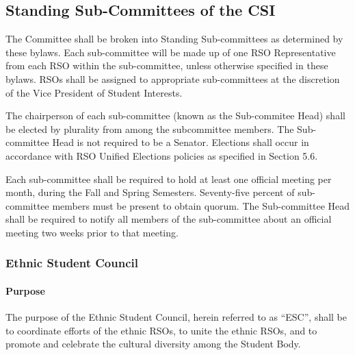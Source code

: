 \documentclass[12pt]{scrreprt}
\begin{document}
\subsection{Standing Sub-Committees of the CSI} \label{sec:csi_subcommittees}
The Committee shall be broken into Standing Sub-committees as determined by 
these bylaws. Each sub-committee will be made up of one RSO Representative from each RSO within the sub-committee, unless otherwise 
specified in these bylaws. RSOs shall be assigned to appropriate sub-committees at the discretion of the Vice President of Student Interests.

The chairperson of each sub-committee (known as the Sub-commitee Head) shall be elected by plurality from among the subcommittee members. The Sub-committee Head is not required to be a Senator. Elections shall occur in accordance with RSO Unified Elections policies as specified in Section 5.6.

Each sub-committee shall be required to hold at least one official
meeting per month, during the Fall and Spring Semesters. Seventy-five
percent of sub-committee members must be present to obtain quorum. The
Sub-committee Head shall be required to notify all members of the
sub-committee about an official meeting two weeks prior to that
meeting.

\subsubsection{Ethnic Student Council}

\paragraph{Purpose}
The purpose of the Ethnic Student Council, herein referred to as ``ESC'', 
shall be to coordinate efforts of the ethnic RSOs, to unite the ethnic RSOs, 
and to promote and celebrate the cultural diversity among the Student Body.
\end{document}
